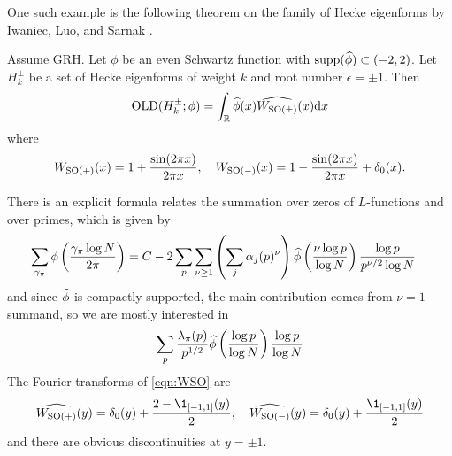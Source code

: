 One such example is the following theorem on the family of Hecke eigenforms by Iwaniec, Luo, and Sarnak \cite{iwaniec2000low}.
\begin{theorem}
    Assume GRH. Let $\phi$ be an even Schwartz function with $\mathrm{supp}(\widehat{\phi}) \subset (-2, 2)$.
    Let $H_k^\pm$ be a set of Hecke eigenforms of weight $k$ and root number $\epsilon = \pm 1$.
    Then
    \begin{equation}
        \mathrm{OLD}(H_k^\pm; \phi) = \int_{\mathbb{R}} \widehat{\phi}(x) \widehat{W_{\mathrm{SO}(\pm)}}(x) \mathrm{d} x
    \end{equation}
    where
    \begin{equation}
        \label{eqn:WSO}
        W_{\mathrm{SO}(+)}(x) = 1 + \frac{\sin(2\pi x)}{2 \pi x}, \quad W_{\mathrm{SO}(-)}(x) = 1 - \frac{\sin(2\pi x)}{2 \pi x} + \delta_0(x).
    \end{equation}
\end{theorem}
There is an explicit formula relates the summation over zeros of $L$-functions and over primes, which is given by \cite[Section 4]{iwaniec2000low}
\begin{align*}
    \sum_{\gamma_\pi} \phi\left(\frac{\gamma_\pi \log N}{2\pi}\right) &= C - 2 \sum_p \sum_{\nu \ge 1} \left(\sum_{j} \alpha_j(p)^\nu\right) \widehat{\phi}\left(\frac{\nu \log p}{\log N}\right) \frac{\log p}{p^{\nu/2} \log N}
\end{align*}
and since $\widehat{\phi}$ is compactly supported, the main contribution comes from $\nu = 1$ summand, so we are mostly interested in 
\begin{equation}
    \sum_{p} \frac{\lambda_\pi(p)}{p^{1/2}} \widehat{\phi}\left(\frac{\log p}{\log N}\right) \frac{\log p}{\log N} 
\end{equation}
The Fourier transforms of \eqref{eqn:WSO} are
\begin{equation}
    \what{W_{\SO(+)}}(y) = \delta_0(y) + \frac{2 - \1_{[-1, 1]}(y)}{2}, \quad \what{W_{\SO(-)}}(y) = \delta_0(y) + \frac{\1_{[-1, 1]}(y)}{2}
\end{equation}
and there are obvious discontinuities at $y = \pm 1$.


\cite{lowry2025murmurations}